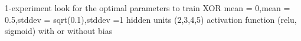 1-experiment
look for the optimal parameters to train XOR
mean = 0,mean = 0.5,stddev = sqrt(0.1),stddev =1
hidden units (2,3,4,5)
activation function (relu, sigmoid)
with or without bias
